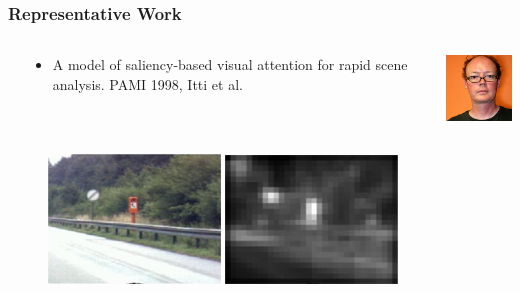 \documentclass[notheorems,serif,table,compress]{beamer}  %
\begin{document}
\begin{frame}
\frametitle{Representative Work}
\begin{columns}
\begin{column}{\leftmargini}
\end{column}
\begin{column}{0.6\linewidth}
\begin{itemize}
\item A model of saliency-based visual attention for rapid scene analysis. PAMI 1998, Itti et al.
\end{itemize}
\end{column}
\begin{column}{0.45\linewidth}
\centering\includegraphics[width=1in]{itti}
\end{column}
\end{columns}\vspace{1ex}

\begin{figure}[!ht]
  \begin{minipage}[t]{0.45\textwidth}
  \includegraphics[width=1.8in]{sign}
  \end{minipage}
  \begin{minipage}[t]{0.45\textwidth}
  \includegraphics[width=1.8in]{signSaliency}
  \end{minipage}
  \end{figure} 
\end{frame}
\end{document}
